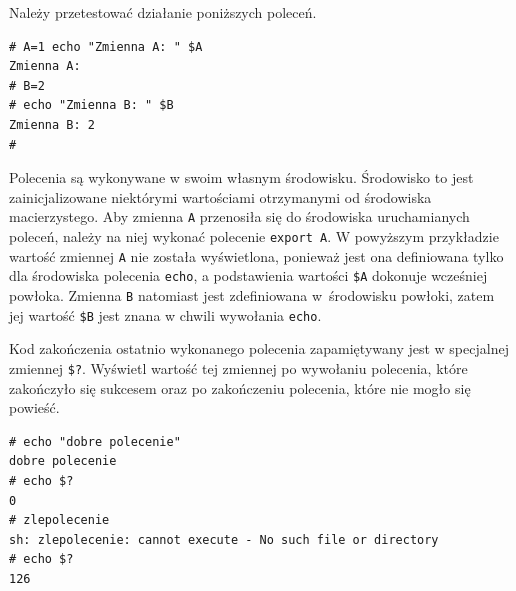 \begin{example} Należy przetestować działanie poniższych poleceń.

\begin{lstlisting}[style=MyBashStyle]
# A=1 echo "Zmienna A: " $A
Zmienna A:
# B=2
# echo "Zmienna B: " $B
Zmienna B: 2
#
\end{lstlisting}

Polecenia są wykonywane w swoim własnym środowisku. Środowisko to jest zainicjalizowane niektórymi wartościami otrzymanymi od środowiska macierzystego. Aby zmienna \lstinline[style=MyBashStyle]{A} przenosiła się do środowiska uruchamianych poleceń, należy na niej wykonać polecenie \lstinline[deletekeywords={export}]{export A}. W powyższym przykładzie wartość zmiennej \lstinline[style=MyBashStyle]{A} nie została wyświetlona, ponieważ jest ona definiowana tylko dla środowiska polecenia \lstinline[style=MyBashStyle]{echo}, a podstawienia wartości \lstinline[style=MyBashStyle]{$A} dokonuje wcześniej powłoka. Zmienna \lstinline[style=MyBashStyle]{B} natomiast jest zdefiniowana w~środowisku powłoki, zatem jej wartość \lstinline[style=MyBashStyle]{$B} jest znana w chwili wywołania \lstinline[style=MyBashStyle]{echo}.

\end{example}


\begin{example}
Kod zakończenia ostatnio wykonanego polecenia zapamiętywany jest w specjalnej zmiennej \lstinline[style=MyBashStyle]{$?}. Wyświetl wartość tej zmiennej po wywołaniu polecenia, które zakończyło się sukcesem oraz po zakończeniu polecenia, które nie mogło się powieść.

\begin{lstlisting}[style=MyBashStyle]
# echo "dobre polecenie"
dobre polecenie
# echo $?
0
# zlepolecenie
sh: zlepolecenie: cannot execute - No such file or directory
# echo $?
126
\end{lstlisting}
\end{example}


